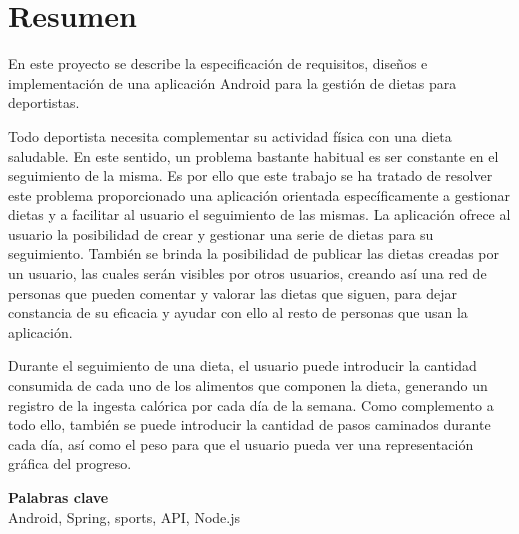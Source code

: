 \newpage
\chapter*{Resumen}
\noindent



En este proyecto se describe la especificación de requisitos, diseños e implementación de una aplicación Android para la gestión de dietas para deportistas.

Todo deportista necesita complementar su actividad física con una dieta saludable. En este sentido, un problema bastante habitual es ser constante en el seguimiento de la misma. Es por ello que este trabajo se ha tratado de resolver este problema proporcionado una aplicación orientada específicamente a gestionar dietas y a facilitar al usuario el seguimiento de las mismas. La aplicación ofrece al usuario la posibilidad de crear y gestionar una serie de dietas para su seguimiento. También se brinda la posibilidad de publicar las dietas creadas por un usuario, las cuales serán visibles por otros usuarios, creando así una red de personas que pueden comentar y valorar las dietas que siguen, para dejar constancia de su eficacia y ayudar con ello al resto de personas que usan la aplicación.

Durante el seguimiento de una dieta, el usuario puede introducir la cantidad consumida de cada uno de los alimentos que componen la dieta, generando un registro de la ingesta calórica por cada día de la semana. Como complemento a todo ello, también se puede introducir la cantidad de pasos caminados durante cada día, así como el peso para que el usuario pueda ver una representación gráfica del progreso.


\begin{center}
    \textbf{Palabras clave}\\
    Android, Spring, sports, API, Node.js
\end{center}
